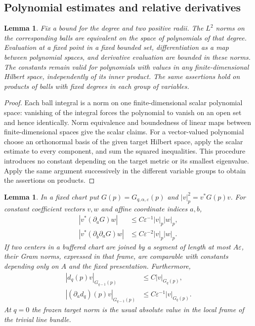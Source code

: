 \documentclass[11pt,reqno]{amsart}
\numberwithin{equation}{section}
\newtheorem{lemma}[theorem]{Lemma}
\theoremstyle{definition}
\theoremstyle{remark}
\begin{document}
\subsection{Polynomial estimates and relative derivatives}

\begin{lemma}\label{ana:polynomial-estimates}
Fix a bound for the degree and two positive radii.  The $L^2$ norms on
the corresponding balls are equivalent on the space of polynomials of
that degree.  Evaluation at a fixed point in a fixed bounded set,
differentiation as a map between polynomial spaces, and derivative
evaluation are bounded in these norms.  The constants remain valid
for polynomials with values in any finite-dimensional Hilbert space,
independently of its inner product.  The same assertions hold on
products of balls with fixed degrees in each group of variables.
\end{lemma}

\begin{proof}
Each ball integral is a norm on one finite-dimensional scalar polynomial
space: vanishing of the integral forces the polynomial to vanish on an
open set and hence identically.  Norm equivalence and boundedness of
linear maps between finite-dimensional spaces give the scalar claims.
For a vector-valued polynomial choose an orthonormal basis of the given
target Hilbert space, apply the scalar estimate to every component,
and sum the squared inequalities.  This procedure introduces no
constant depending on the target metric or its smallest eigenvalue.
Apply the same argument successively in the different variable groups
to obtain the assertions on products.
\end{proof}

\begin{lemma}\label{ana:relative-gram}
In a fixed chart put $G(p)=G_{q,\alpha,\varepsilon}(p)$ and
$|v|_p^2=v^*G(p)v$.  For constant coefficient vectors $v,w$ and affine
coordinate indices $a,b$,
\begin{align}
 |v^*(\partial_aG)w|&\leq C\varepsilon^{-1}|v|_p|w|_p,
 \label{ana:first-relative}\\
 |v^*(\partial_{\bar b}\partial_aG)w|
 &\leq C\varepsilon^{-2}|v|_p|w|_p.
 \label{ana:second-relative}
\end{align}
If two centers in a buffered chart are joined by a segment of length
at most $A\varepsilon$, their Gram norms, expressed in that frame,
are comparable with constants depending only on $A$ and the fixed
presentation.  Furthermore,
\begin{align}
 |d_q(p)v|_{G_{q-1}(p)}&\leq C|v|_{G_q(p)},
 \label{ana:local-map}\\
 |(\partial_a d_q)(p)v|_{G_{q-1}(p)}
 &\leq C\varepsilon^{-1}|v|_{G_q(p)}.
 \label{ana:local-map-derivative}
\end{align}
At $q=0$ the frozen target norm is the usual absolute value in the
local frame of the trivial line bundle.
\end{lemma}
\end{document}
